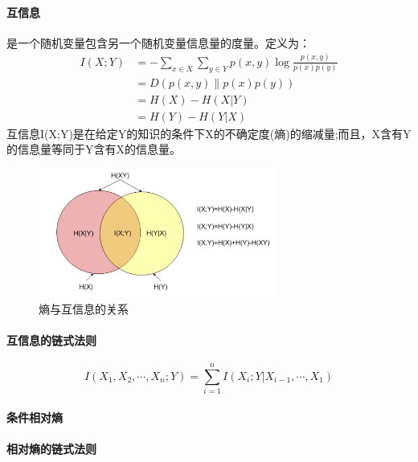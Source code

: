 \documentclass[10pt,letterpaper]{article}
\begin{document}
\paragraph{互信息} 是一个随机变量包含另一个随机变量信息量的度量。定义为：\\
\begin{equation}
	\begin{split}
		I(X;Y) &= -\sum_{x \in X} \sum_{y \in Y} p(x,y)\log {\frac{p(x,y)}{p(x)p(y)}}\\
		&= D(p(x,y) \parallel p(x)p(y)) \\
		&= H(X) - H(X|Y) \\
		&= H(Y) - H(Y|X)
	\end{split}
\end{equation}
互信息I(X;Y)是在给定Y的知识的条件下X的不确定度(熵)的缩减量;而且，X含有Y的信息量等同于Y含有X的信息量。
\begin{figure}[H] %
	\centering %
	\includegraphics[width=0.7\textwidth]{../images/shang_huxinxi.png} %
	\caption{熵与互信息的关系} %
	\label{Fig.main2} %
\end{figure}

\paragraph{互信息的链式法则}
\begin{equation}
	I(X_1,X_2,\cdots, X_n;Y) = \sum_{i=1}^n I(X_i;Y|X_{i-1}, \cdots, X_1 )
\end{equation}

\paragraph{条件相对熵}
\paragraph{相对熵的链式法则}
\end{document}
